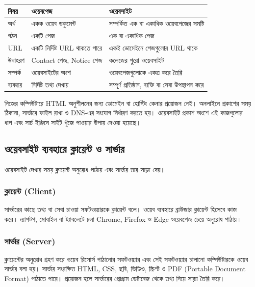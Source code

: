 \begin{center}
\begin{tabular}{|p{}|p{}|p{}|}
\hline
\textbf{বিষয়} & \textbf{ওয়েবপেজ} & \textbf{ওয়েবসাইট} \\
\hline
অর্থ & একক ওয়েব ডকুমেন্ট & সম্পর্কিত এক বা একাধিক ওয়েবপেজের সমষ্টি \\
\hline
গঠন & একটি পেজ & এক বা একাধিক পেজ \\
\hline
URL & একটি নির্দিষ্ট URL থাকতে পারে & একই ডোমেইনে পেজগুলোর URL থাকে \\
\hline
উদাহরণ & Contact পেজ, Notice পেজ & কলেজের পুরো ওয়েবসাইট \\
\hline
সম্পর্ক & ওয়েবসাইটের অংশ & ওয়েবপেজগুলোকে একত্র করে তৈরি \\
\hline
ব্যবহার & নির্দিষ্ট তথ্য দেখায় & সম্পূর্ণ প্রতিষ্ঠান, ব্যক্তি বা সেবা উপস্থাপন করে \\
\hline
\end{tabular}
\end{center}

নিজের কম্পিউটারে HTML অনুশীলনের জন্য ডোমেইন বা হোস্টিং কেনার প্রয়োজন নেই। অনলাইনে প্রকাশের সময় ঠিকানা, সার্ভারে ফাইল রাখা ও DNS-এর সংযোগ নির্ধারণ করতে হয়। ওয়েবসাইট প্রকাশ অংশে এই কাজগুলোর ধাপ এবং সার্চ ইঞ্জিনে সাইট খুঁজে পাওয়ার উপায় দেওয়া হয়েছে।



\subsection{ওয়েবসাইট ব্যবহারে ক্লায়েন্ট ও সার্ভার}

ওয়েবসাইট দেখার সময় ক্লায়েন্ট অনুরোধ পাঠায় এবং সার্ভার তার সাড়া দেয়।

\subsubsection{ক্লায়েন্ট (Client)}

সার্ভারের কাছে তথ্য বা সেবা চাওয়া সফটওয়্যারকে ক্লায়েন্ট বলে। ওয়েব ব্যবহারে ব্রাউজার ক্লায়েন্ট হিসেবে কাজ করে। ল্যাপটপ, মোবাইল বা ট্যাবলেটে চলা Chrome, Firefox ও Edge ওয়েবপেজ চেয়ে অনুরোধ পাঠায়।

\subsubsection{সার্ভার (Server)}

ক্লায়েন্টের অনুরোধ গ্রহণ করে ওয়েব রিসোর্স পাঠানোর সফটওয়্যার এবং সেই সফটওয়্যার চালানো কম্পিউটারকে ওয়েব সার্ভার বলা হয়। সার্ভার সংরক্ষিত HTML, CSS, ছবি, ভিডিও, স্ক্রিপ্ট ও PDF (Portable Document Format) পাঠাতে পারে। প্রয়োজন হলে সার্ভারের প্রোগ্রাম ডেটাবেজ থেকে তথ্য নিয়ে সাড়া তৈরি করে।

